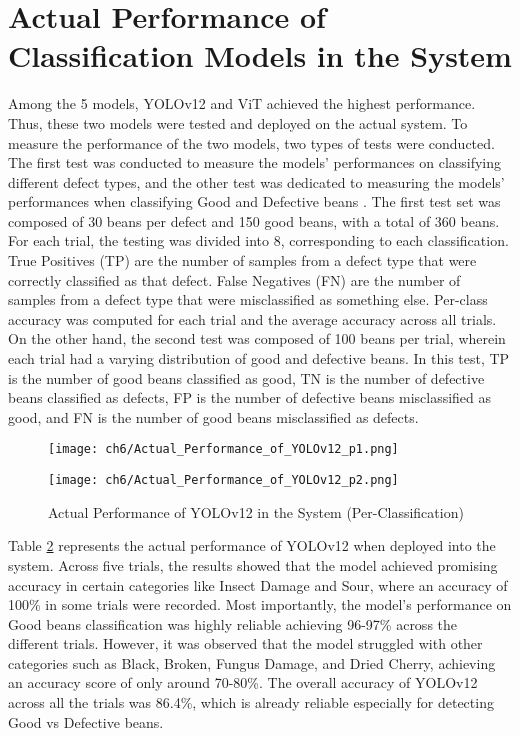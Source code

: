 \section{Actual Performance of Classification Models in the System}

Among the 5 models, YOLOv12 and ViT achieved the highest performance. Thus, these two models were tested and deployed on the actual system. To measure the performance of the two models, two types of tests were conducted. The first test was conducted to measure the models’ performances on classifying different defect types, and the other test was dedicated to measuring the models’ performances when classifying Good and Defective beans . The first test set was composed of 30 beans per defect and 150 good beans, with a total of 360 beans. For each trial, the testing was divided into 8, corresponding to each classification. True Positives (TP) are the number of samples from a defect type that were correctly classified as that defect. False Negatives (FN) are the number of samples from a defect type that were misclassified as something else. Per-class accuracy was computed for each trial and the average accuracy across all trials. On the other hand, the second test was composed of 100 beans per trial, wherein each trial had a varying distribution of good and defective beans. In this test, TP is the number of good beans classified as good, TN is the number of defective beans classified as defects, FP is the number of defective beans misclassified as good, and FN is the number of good beans misclassified as defects. 

\begin{figure}[H]
    \centering
    \texttt{[image: ch6/Actual\_Performance\_of\_YOLOv12\_p1.png]}
    \label{fig:actual_performance_v12}
\end{figure}

\begin{figure}[H]
    \centering
    \texttt{[image: ch6/Actual\_Performance\_of\_YOLOv12\_p2.png]}
    \caption{Actual Performance of YOLOv12 in the System (Per-Classification)}
    \label{fig:actual_performance_v12}
\end{figure}
Table \ref{fig:actual_performance_v12} represents the actual performance of YOLOv12 when deployed into the system. Across five trials, the results showed that the model achieved promising accuracy in certain categories like Insect Damage and Sour, where an accuracy of 100\% in some trials were recorded. Most importantly, the model’s performance on Good beans classification was highly reliable achieving 96-97\% across the different trials. However, it was observed that the model struggled with other categories such as Black, Broken, Fungus Damage, and Dried Cherry, achieving an accuracy score of only around 70-80\%. The overall accuracy of YOLOv12 across all the trials was 86.4\%, which is already reliable especially for detecting Good vs Defective beans. 

